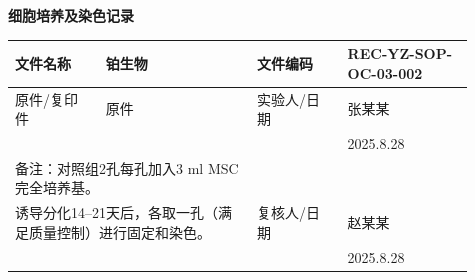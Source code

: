 \documentclass[UTF8,10pt,a4paper,fontset=fandol]{ctexart}
\newcommand{\fieldvalue}[1]{#1}
\newcommand{\handwritten}[1]{#1}
\begin{document}

\newpage

\begin{center}
\textbf{细胞培养及染色记录}
\end{center}

\noindent
\begin{tabular}{|p{0.18\linewidth}|p{0.30\linewidth}|p{0.18\linewidth}|p{0.25\linewidth}|}
\hline
文件名称 & 铂生物 & 文件编码 & REC-YZ-SOP-OC-03-002 \\ \hline
原件/复印件 & 原件 & 实验人/日期 &
\fieldvalue{\handwritten{张某某}}\\
&&&
\fieldvalue{\handwritten{2025.8.28}}\\ \hline
\multicolumn{2}{|l|}{备注：对照组2孔每孔加入3 ml MSC完全培养基。}&&\\
\multicolumn{2}{|l|}{诱导分化14--21天后，各取一孔（满足质量控制）进行固定和染色。}
& 复核人/日期 &
\fieldvalue{\handwritten{赵某某}}\\
&&&
\fieldvalue{\handwritten{2025.8.28}}\\ \hline
\end{tabular}

\vspace{2pt}
\end{document}
